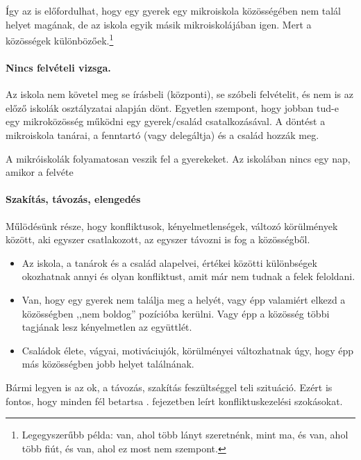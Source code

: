 Így az is előfordulhat, hogy egy gyerek egy mikroiskola közösségében nem talál
helyet magának, de az iskola egyik másik mikroiskolájában igen. Mert a
közösségek különbözőek.\footnote{Legegyszerűbb példa: van, ahol több lányt
      szeretnénk, mint ma, és van, ahol több fiút, és van, ahol ez most nem
      szempont.}

\paragraph{Nincs felvételi vizsga.}
Az iskola nem követel meg se írásbeli (központi), se szóbeli
felvételit, és nem is az előző iskolák osztályzatai alapján dönt. Egyetlen
szempont, hogy jobban tud-e egy mikroközösség működni egy gyerek/család
csatalkozásával. A döntést a mikroiskola tanárai, a fenntartó (vagy
delegáltja) és a család hozzák meg.

A mikróiskolák folyamatosan veszik fel a gyerekeket. Az iskolában nincs egy nap, amikor a felvéte

\paragraph{Szakítás, távozás, elengedés}
Műlödésünk része, hogy konfliktusok, kényelmetlenségek, változó körülmények
között, aki egyszer csatlakozott, az egyszer távozni is fog a közösségből.
\begin{itemize}
      \item Az iskola, a tanárok és a család alapelvei, értékei közötti
            különbségek okozhatnak annyi és olyan konfliktust, amit már nem
            tudnak a felek
            feloldani.
      \item Van, hogy egy gyerek nem találja meg a helyét, vagy épp valamiért
            elkezd a közösségben ,,nem boldog'' pozícióba kerülni. Vagy épp a
            közösség
            többi tagjának lesz kényelmetlen az együttlét.
      \item Családok élete, vágyai, motiváciujók, körülményei változhatnak úgy,
            hogy épp más közösségben jobb helyet találnának.
\end{itemize}

Bármi legyen is az ok, a távozás, szakítás feszültséggel teli szituáció. Ezért
is fontos, hogy minden fél betartsa  .
fejezetben leírt konfliktuskezelési szokásokat.